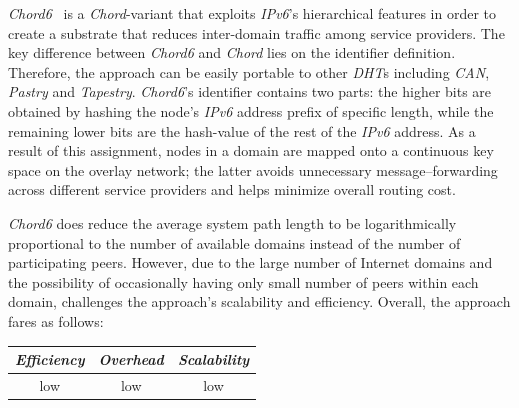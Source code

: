 \emph{Chord6}~\cite{XZHL2005} is a \emph{Chord}-variant that
exploits {\sl IPv6}'s  hierarchical features in order to create 
a substrate that reduces inter-domain traffic among service providers. 
The key difference between
\emph{Chord6} and \emph{Chord} lies on the identifier definition. 
Therefore, the approach can be easily portable to other 
\emph{DHT}s including \emph{CAN}, \emph{Pastry} and \emph{Tapestry}. 
\emph{Chord6}'s identifier contains two parts: 
the higher bits are obtained by hashing the
node's {\sl IPv6} address prefix of specific length, 
while the remaining lower bits are the hash-value 
of the rest of the {\sl IPv6} address. 
As a result of this assignment, nodes in a domain are mapped 
onto a continuous key space on the overlay network;
the latter avoids unnecessary message--forwarding across different
service providers and helps minimize overall routing cost.

\emph{Chord6} does reduce the average system path length to be
logarithmically proportional to the number of available domains 
instead of the number of participating peers. 
However, due to the large number of Internet
domains and the possibility of occasionally having only 
small number of peers within each domain,
\cite{DK2006} challenges the approach's scalability and efficiency.
Overall, the approach fares as follows:
\begin{center}
{\footnotesize
\begin{tabular}{ccc}
\emph{Efficiency} & \emph{Overhead} & \emph{Scalability} \\
\hline
low &
low &
low
\end{tabular}
}
\end{center}

